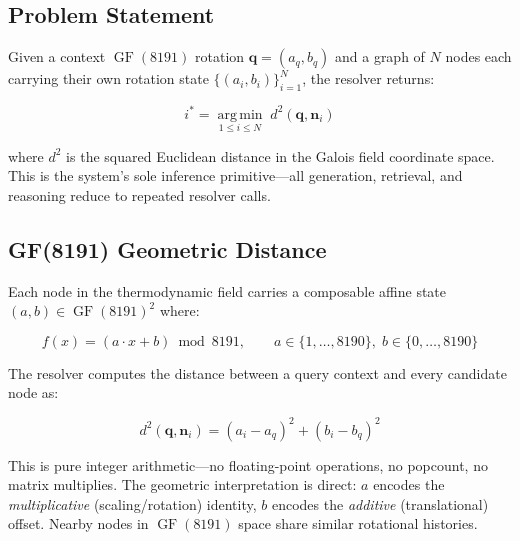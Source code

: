 \subsection{Problem Statement}
\label{sec:bestfill_problem}

Given a context $\operatorname{GF}(8191)$ rotation $\mathbf{q} = (a_q, b_q)$
and a graph of $N$ nodes each carrying their own rotation state
$\{(a_i, b_i)\}_{i=1}^{N}$, the resolver returns:

\begin{equation}
  i^* = \operatorname*{arg\,min}_{1 \leq i \leq N}\;
        d^2(\mathbf{q}, \mathbf{n}_i)
  \label{eq:resolver_argmin}
\end{equation}

where $d^2$ is the squared Euclidean distance in the Galois field coordinate
space.  This is the system's sole inference primitive---all generation,
retrieval, and reasoning reduce to repeated resolver calls.

\subsection{GF(8191) Geometric Distance}
\label{sec:gf_distance}

Each node in the thermodynamic field carries a composable affine state
$(a, b) \in \operatorname{GF}(8191)^2$ where:

\begin{equation}
  f(x) = (a \cdot x + b) \bmod 8191, \qquad a \in \{1, \ldots, 8190\},\; b \in \{0, \ldots, 8190\}
  \label{eq:gf_affine}
\end{equation}

The resolver computes the distance between a query context and every candidate
node as:

\begin{equation}
  d^2(\mathbf{q}, \mathbf{n}_i) = (a_i - a_q)^2 + (b_i - b_q)^2
  \label{eq:gf_distance}
\end{equation}

This is pure integer arithmetic---no floating-point operations, no popcount,
no matrix multiplies.  The geometric interpretation is direct: $a$ encodes
the \emph{multiplicative} (scaling/rotation) identity, $b$ encodes the
\emph{additive} (translational) offset.  Nearby nodes in
$\operatorname{GF}(8191)$ space share similar rotational histories.

